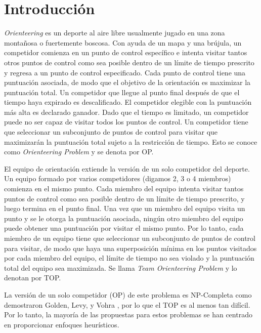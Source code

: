 \chapter{Introducción}

\textit{Orienteering} es un deporte al aire libre usualmente jugado en una zona montañosa o fuertemente boscosa. Con ayuda de un mapa y una brújula, un competidor comienza en un punto de control específico e intenta visitar tantos otros puntos de control como sea posible dentro de un límite de tiempo prescrito y regresa a un punto de control especificado. Cada punto de control tiene una puntuación asociada, de modo que el objetivo de la orientación es maximizar la puntuación total. Un competidor que llegue al punto final después de que el tiempo haya expirado es descalificado. El competidor elegible con la puntuación más alta es declarado ganador. Dado que el tiempo es limitado, un competidor puede no ser capaz de visitar todos los puntos de control. Un competidor tiene que seleccionar un subconjunto de puntos de control para visitar que maximizarán la puntuación total sujeto a la restricción de tiempo. Esto se conoce como \textit{Orienteering Problem} y se denota por OP.

\bigskip

El equipo de orientación extiende la versión de un solo competidor del deporte. Un equipo formado por varios competidores (digamos 2, 3 o 4 miembros) comienza en el mismo punto. Cada miembro del equipo intenta visitar tantos puntos de control como sea posible dentro de un límite de tiempo prescrito, y luego termina en el punto final. Una vez que un miembro del equipo visita un punto y se le otorga la puntuación asociada, ningún otro miembro del equipo puede obtener una puntuación por visitar el mismo punto. Por lo tanto, cada miembro de un equipo tiene que seleccionar un subconjunto de puntos de control para visitar, de modo que haya una superposición mínima en los puntos visitados por cada miembro del equipo, el límite de tiempo no sea violado y la puntuación total del equipo sea maximizada. Se llama \textit{Team Orienteering Problem} y lo denotan por TOP.

\bigskip

La versión de un solo competidor (OP) de este problema es NP-Completa como demostraron Golden, Levy, y Vohra \cite{GoldenLevyVohra}, por lo que el TOP es al menos tan difícil. Por lo tanto, la mayoría de las propuestas para estos problemas se han centrado en proporcionar enfoques heurísticos.

\bigskip

